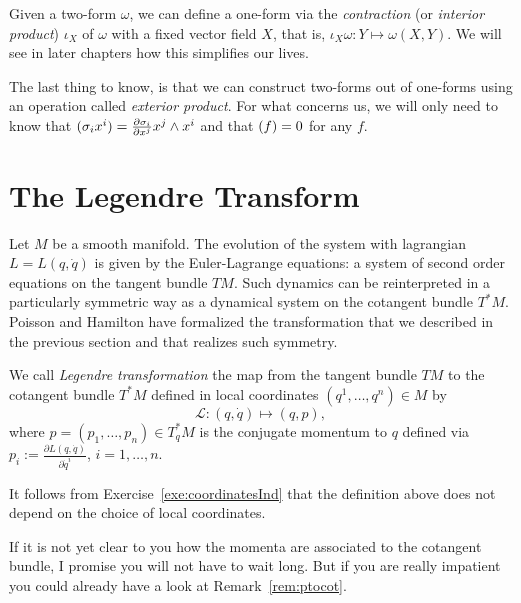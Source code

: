 \documentclass[english,fontsize=11pt,paper=a5,oneside]{scrbook}
\newcommand{\cL}{\mathcal{L}}
\let\d\relax
\newcommand{\d}{\mathrm{d}}
\theoremstyle{definition}
\begin{document}
Given a two-form $\omega$, we can define a one-form via the \emph{contraction} (or \emph{interior product}) $\iota_X$ of $\omega$ with a fixed vector field $X$, that is, $\iota_X \omega : Y \mapsto \omega(X, Y)$. We will see in later chapters how this simplifies our lives.

The last thing to know, is that we can construct two-forms out of one-forms using an operation called \emph{exterior product}.
For what concerns us, we will only need to know that $\d (\sigma_i \d x^i) = \frac{\partial \sigma_i}{\partial x^j} \d x^j \wedge \d x^i$ and that $\d (\d f) = 0$ for any $f$.

\section{The Legendre Transform}

Let $M$ be a smooth manifold.
The evolution of the system with lagrangian $L=L(q,\dot q)$ is given by the Euler-Lagrange equations: a system of second order equations on the tangent bundle $TM$.
Such dynamics can be reinterpreted in a particularly symmetric way as a dynamical system on the cotangent bundle $T^*M$.
Poisson and Hamilton have formalized the transformation that we described in the previous section and that realizes such symmetry.

\begin{tcolorbox}
  We call \emph{Legendre transformation} the map from the tangent bundle $TM$ to the cotangent bundle $T^*M$ defined in local coordinates $(q^1, \ldots, q^n)\in M$ by
  \begin{equation}\label{eq:legrendreTrafo}
    \cL: (q,\dot q) \mapsto (q,p),
  \end{equation}
  where $p = (p_1, \ldots, p_n) \in T^*_q M$ is the conjugate momentum to $q$ defined via $p_i := \frac{\partial L(q,\dot q)}{\partial \dot q^i}$, $i=1,\ldots,n$.
\end{tcolorbox}
It follows from Exercise~\ref{exe:coordinatesInd} that the definition above does not depend on the choice of local coordinates.


If it is not yet clear to you how the momenta are associated to the cotangent bundle, I promise you will not have to wait long. But if you are really impatient you could already have a look at Remark~\ref{rem:ptocot}.
\end{document}
